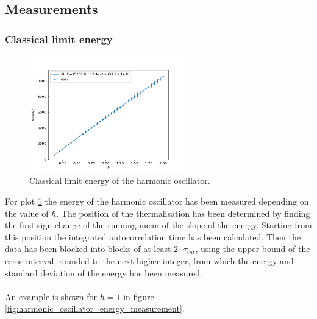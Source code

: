 \documentclass{scrartcl}
\begin{document}
	\subsection{Measurements}
	\subsubsection{Classical limit energy}
		\begin{figure}[H]
			\centering
				\includegraphics[width=0.6\textwidth]{../imgs/harmonic_oscillator_classical_limit_energy/harmonic_oscillator_10_classical_limit_energy.pdf}
			\caption{Classical limit energy of the harmonic oscillator.}
			\label{fig:harmonic_oscillator_classical_limit_energy}
		\end{figure}
		For plot \ref{fig:harmonic_oscillator_classical_limit_energy} the energy of the harmonic oscillator has been measured depending on the value of $\hbar$.
		The position of the thermalisation has been determined by finding the first sign change of the running mean of the slope of the energy.
		Starting from this position the integrated autocorrelation time has been calculated.
		Then the data has been blocked into blocks of at least $2 \cdot \tau_{int}$, using the upper bound of the error interval, rounded to the next higher integer, from which the energy and standard deviation of the energy has been measured.
		\\\\
		An example is shown for $\hbar = 1$ in figure \ref{fig:harmonic_oscillator_energy_measurement}.
\end{document}
